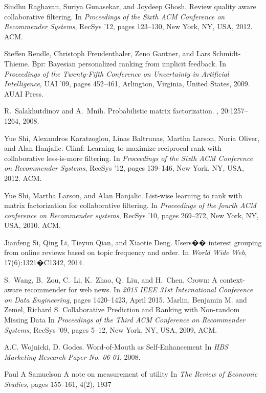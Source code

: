\documentclass[preprint,12pt]{elsarticle}
\begin{document}
\begin{thebibliography}{10}
Sindhu Raghavan, Suriya Gunasekar, and Joydeep Ghosh.
\newblock Review quality aware collaborative filtering.
\newblock In {\em Proceedings of the Sixth ACM Conference on Recommender
  Systems}, RecSys '12, pages 123--130, New York, NY, USA, 2012. ACM.

Steffen Rendle, Christoph Freudenthaler, Zeno Gantner, and Lars Schmidt-Thieme.
\newblock Bpr: Bayesian personalized ranking from implicit feedback.
\newblock In {\em Proceedings of the Twenty-Fifth Conference on Uncertainty in
  Artificial Intelligence}, UAI '09, pages 452--461, Arlington, Virginia,
  United States, 2009. AUAI Press.

R.~Salakhutdinov and A.~Mnih.
\newblock Probabilistic matrix factorization.
,
  20:1257--1264, 2008.

Yue Shi, Alexandros Karatzoglou, Linas Baltrunas, Martha Larson, Nuria Oliver,
  and Alan Hanjalic.
\newblock Climf: Learning to maximize reciprocal rank with collaborative
  less-is-more filtering.
\newblock In {\em Proceedings of the Sixth ACM Conference on Recommender
  Systems}, RecSys '12, pages 139--146, New York, NY, USA, 2012. ACM.

Yue Shi, Martha Larson, and Alan Hanjalic.
\newblock List-wise learning to rank with matrix factorization for
  collaborative filtering.
\newblock In {\em Proceedings of the fourth ACM conference on Recommender
  systems}, RecSys '10, pages 269--272, New York, NY, USA, 2010. ACM.

Jianfeng Si, Qing Li, Tieyun Qian, and Xiaotie Deng.
\newblock Users�� interest grouping from online reviews based on topic
  frequency and order.
\newblock In {\em World Wide Web}, 17(6):1321�C1342, 2014.

S.~Wang, B.~Zou, C.~Li, K.~Zhao, Q.~Liu, and H.~Chen.
\newblock Crown: A context-aware recommender for web news.
\newblock In {\em 2015 IEEE 31st International Conference on Data Engineering},
  pages 1420--1423, April 2015.
Marlin, Benjamin M. and Zemel, Richard S.
\newblock Collaborative Prediction and Ranking with Non-random Missing Data
\newblock In {\em Proceedings of the Third ACM Conference on Recommender Systems}, RecSys '09, pages 5--12, New York, NY, USA, 2009, ACM.

\newblock A.C. Wojnicki, D. Godes. 
\newblock Word-of-Mouth as Self-Enhancement
\newblock In {\em HBS Marketing Research Paper No.
06-01}, 2008. 

\newblock Paul A Samuelson 
\newblock A note on measurement of utility
\newblock In {\em The Review of Economic Studies}, pages 155--161, 4(2), 1937

\end{thebibliography}
\end{document}
